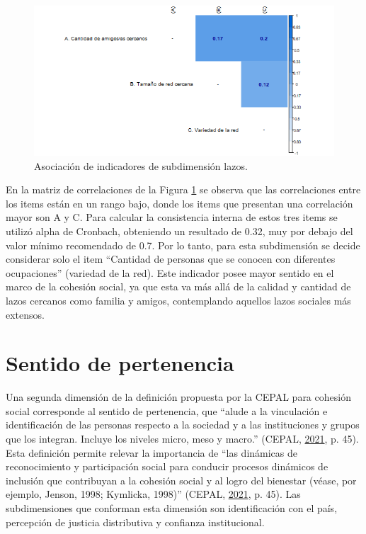 \documentclass[
  12pt,
]{book}
\begin{document}
\begin{figure}[H]

{\centering \includegraphics[width=1\linewidth,height=1\textheight]{output/graphs/lazos_cor} 

}

\caption{Asociación de indicadores de subdimensión lazos.}\label{fig:lazos-cor}
\end{figure}

En la matriz de correlaciones de la Figura \ref{fig:lazos-cor} se observa que las correlaciones entre los items están en un rango bajo, donde los items que presentan una correlación mayor son A y C. Para calcular la consistencia interna de estos tres items se utilizó alpha de Cronbach, obteniendo un resultado de 0.32, muy por debajo del valor mínimo recomendado de 0.7. Por lo tanto, para esta subdimensión se decide considerar solo el item ``Cantidad de personas que se conocen con diferentes ocupaciones'' (variedad de la red). Este indicador posee mayor sentido en el marco de la cohesión social, ya que esta va más allá de la calidad y cantidad de lazos cercanos como familia y amigos, contemplando aquellos lazos sociales más extensos.

\hypertarget{sentido-de-pertenencia}{%
\section{Sentido de pertenencia}\label{sentido-de-pertenencia}}

Una segunda dimensión de la definición propuesta por la CEPAL para cohesión social corresponde al sentido de pertenencia, que ``alude a la vinculación e identificación de las personas respecto a la sociedad y a las instituciones y grupos que los integran. Incluye los niveles micro, meso y macro.'' (CEPAL, \protect\hyperlink{ref-cepal_cohesion_2021}{2021}, p. 45). Esta definición permite relevar la importancia de ``las dinámicas de reconocimiento y participación social para conducir procesos dinámicos de inclusión que contribuyan a la cohesión social y al logro del bienestar (véase, por ejemplo, Jenson, 1998; Kymlicka, 1998)'' (CEPAL, \protect\hyperlink{ref-cepal_cohesion_2021}{2021}, p. 45). Las subdimensiones que conforman esta dimensión son identificación con el país, percepción de justicia distributiva y confianza institucional.
\end{document}
